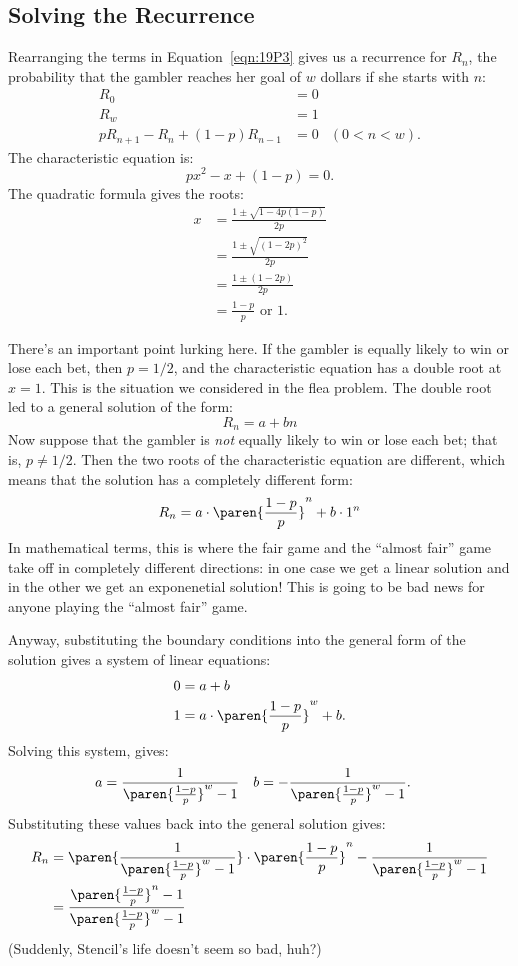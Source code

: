 \subsection{Solving the Recurrence}

Rearranging the terms in Equation~\ref{eqn:19P3} gives us a recurrence
for $R_n$, the probability that the gambler reaches her goal of $w$
dollars if she starts with $n$:
%
\begin{align*}
R_0 & = 0 \\
R_w & = 1 \\
p R_{n + 1} - R_n + (1 - p) R_{n - 1} &= 0
& (0 < n < w).
\end{align*}
%
The characteristic equation is:
%
\[
    p x^2 - x + (1-p) = 0.
\]
%
The quadratic formula gives the roots:
%
\begin{align*}
x & = \frac{1 \pm \sqrt{1 - 4 p (1-p)}}{2p} \\
  & = \frac{1 \pm \sqrt{(1-2p)^2}}{2p} \\
  & = \frac{1 \pm (1-2p)}{2p} \\
  & = \frac{1-p}{p} \text{ or } 1.
\end{align*}

There's an important point lurking here.  If the gambler is equally
likely to win or lose each bet, then $p = 1/2$, and the characteristic
equation has a double root at $x = 1$.  This is the situation we
considered in the flea problem.  The double root led to a general
solution of the form:
%
\[
R_n = a + b n
\]
%
Now suppose that the gambler is \emph{not} equally likely to win or
lose each bet; that is, $p \neq 1/2$.  Then the two roots of the
characteristic equation are different, which means that the solution
has a completely different form:
%
\[
R_n = a \cdot \paren{\frac{1-p}{p}}^n + b \cdot 1^n
\]
%
In mathematical terms, this is where the fair game and the ``almost
fair'' game take off in completely different directions: in one case
we get a linear solution and in the other we get an exponenetial
solution!  This is going to be bad news for anyone playing the
``almost fair'' game.

Anyway, substituting the boundary conditions into the general form of
the solution gives a system of linear equations:
%
\begin{align*}
0 & = a + b \\
1 & = a \cdot \paren{\frac{1-p}{p}}^w + b.
\end{align*}
%
Solving this system, gives:
%
\begin{align*}
a & = \frac{1}{\paren{\frac{1-p}{p}}^w-1} &
b & = - \frac{1}{\paren{\frac{1-p}{p}}^w-1}. &
\end{align*}
%
Substituting these values back into the general solution gives:
%
\begin{align*}
R_n
    & = \paren{\frac{1}{\paren{\frac{1-p}{p}}^w-1}} \cdot
        \paren{\frac{1-p}{p}}^n - \frac{1}{\paren{\frac{1-p}{p}}^w-1} \\
    & = \frac{\paren{\frac{1-p}{p}}^n-1}{\paren{\frac{1-p}{p}}^w-1}
\end{align*}
%
(Suddenly, Stencil's life doesn't seem so bad, huh?)

